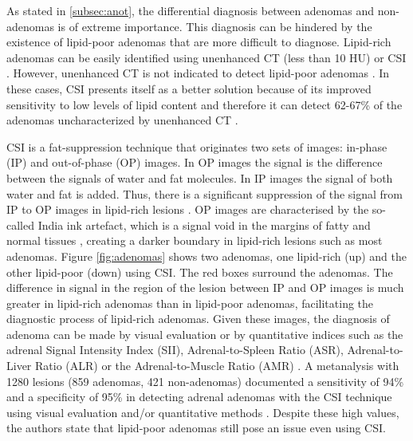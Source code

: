 \documentclass[11pt]{article}
\begin{document}
As stated in \ref{subsec:anot}, the differential diagnosis between adenomas and non-adenomas is
of extreme importance. This diagnosis can be hindered by the existence of
lipid-poor adenomas that are more difficult to diagnose. Lipid-rich adenomas can
be easily identified using unenhanced CT (less than 10 HU) \cite{Panda2015} or CSI
\cite{Platzek2019}. However, unenhanced CT is not indicated to detect lipid-poor
adenomas \cite{Israel2004}. In these cases, CSI presents itself as a better
solution because of its improved sensitivity to low levels of lipid content and
therefore it can detect 62-67\% of the adenomas uncharacterized by unenhanced CT
\cite{Israel2004}.

CSI is a fat-suppression technique that originates two sets of images: in-phase
(IP) and out-of-phase (OP) images. In OP images the signal is the difference
between the signals of water and fat molecules. In IP images the signal of both
water and fat is added. Thus, there is a significant suppression of the signal
from IP to OP images in lipid-rich lesions \cite{Jahanvi2021}. OP images are
characterised by the so-called India ink artefact, which is a signal void in the
margins of fatty and normal tissues \cite{Jahanvi2021}, creating a darker
boundary in lipid-rich lesions such as most adenomas. Figure \ref{fig:adenomas}
shows two adenomas, one lipid-rich (up) and the other lipid-poor (down) using
CSI. The red boxes surround the adenomas. The
difference in signal in the region of the lesion between IP and OP images is much greater in lipid-rich
adenomas than in lipid-poor adenomas, facilitating the diagnostic process of
lipid-rich adenomas. Given these images, the diagnosis of
adenoma can be made by visual evaluation or by quantitative indices such as the
adrenal Signal Intensity Index (SII), Adrenal-to-Spleen Ratio (ASR),
Adrenal-to-Liver Ratio (ALR) or the Adrenal-to-Muscle Ratio (AMR)
\cite{Fujiyoshi2003}. A metanalysis with 1280
lesions (859 adenomas, 421 non-adenomas) documented a sensitivity of 94\% and
a specificity of 95\% in detecting adrenal adenomas with the CSI technique using
visual evaluation and/or quantitative methods \cite{Platzek2019}. Despite these high values, the
authors state that lipid-poor adenomas still pose an issue even using CSI.
\end{document}
